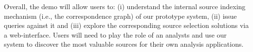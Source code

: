 \documentclass{vldb}
\begin{document}
Overall, the demo will allow users to: (i) understand the internal source indexing mechanism (i.e., the correspondence graph) of our prototype system, (ii) issue queries against it and (iii) explore the corresponding source selection solutions via a web-interface. Users will need to play the role of an analysts and use our system to discover the most valuable sources for their own analysis applications.



\end{document}
